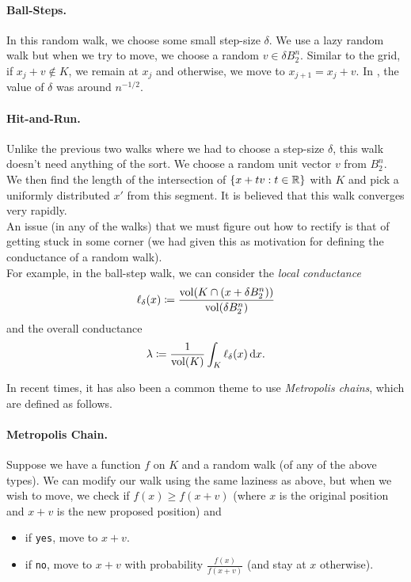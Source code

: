 \paragraph{Ball-Steps.}

In this random walk, we choose some small step-size $\delta$. We use a lazy random walk but when we try to move, we choose a random $v\in\delta B_2^n$. Similar to the grid, if $x_j+v\not\in K$, we remain at $x_j$ and otherwise, we move to $x_{j+1}=x_j+v$. In \cite{KLS-n5}, the value of $\delta$ was around $n^{-1/2}$.

\paragraph{Hit-and-Run.}

Unlike the previous two walks where we had to choose a step-size $\delta$, this walk doesn't need anything of the sort. We choose a random unit vector $v$ from $B_2^n$. We then find the length of the intersection of $\{x+tv:t\in\mathbb{R}\}$ with $K$ and pick a uniformly distributed $x'$ from this segment. It is believed that this walk converges very rapidly.\\

An issue (in any of the walks) that we must figure out how to rectify is that of getting stuck in some corner (we had given this as motivation for defining the conductance of a random walk).\\
For example, in the ball-step walk, we can consider the \textit{local conductance}
\[ \ell_\delta(x) \coloneqq \frac{\operatorname{vol}(K\cap (x+\delta B_2^n))}{\operatorname{vol}(\delta B_2^n)} \]
and the overall conductance
\[ \lambda\coloneqq \frac{1}{\operatorname{vol}(K)} \int_K \ell_\delta(x)\operatorname{d}\!{x}. \]

In recent times, it has also been a common theme to use \textit{Metropolis chains}, which are defined as follows.

\paragraph{Metropolis Chain.} Suppose we have a function $f$ on $K$ and a random walk (of any of the above types). We can modify our walk using the same laziness as above, but when we wish to move, we check if $f(x)\geq f(x+v)$ (where $x$ is the original position and $x+v$ is the new proposed position) and
\begin{itemize}
    \item if \texttt{yes}, move to $x+v$.
    \item if \texttt{no}, move to $x+v$ with probability $\frac{f(x)}{f(x+v)}$ (and stay at $x$ otherwise).
\end{itemize}

